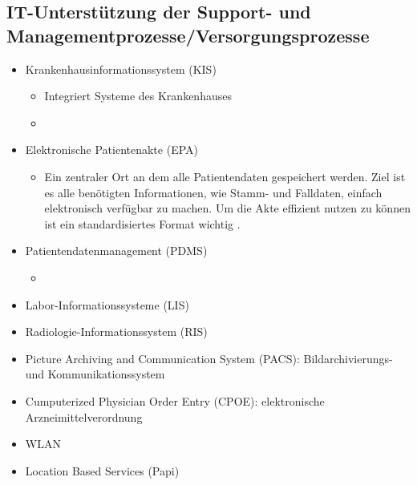 	\subsection{IT-Unterstützung der Support- und Managementprozesse/Versorgungsprozesse}
	\parencite{oswald2019} \parencite[14]{braeutigam2017}
	\begin{itemize}
		\item Krankenhausinformationssystem (KIS)

		\begin{itemize}
			\item Integriert Systeme des Krankenhauses
			\item 
		\end{itemize}
		\item Elektronische Patientenakte (EPA)
		\begin{itemize}
			\item Ein zentraler Ort an dem alle Patientendaten gespeichert werden. Ziel ist es alle benötigten Informationen, wie Stamm- und Falldaten, einfach elektronisch verfügbar zu machen. Um die Akte effizient nutzen zu können ist ein standardisiertes Format wichtig \parencite[62]{oswald2019}.
		\end{itemize}
		\item Patientendatenmanagement (PDMS)
		\begin{itemize}
			\item 
		\end{itemize}
		\item Labor-Informationssysteme (LIS)
		\item Radiologie-Informationssystem (RIS)
		\item Picture Archiving and Communication System (PACS): Bildarchivierungs- und Kommunikationssystem
		\item Cumputerized Physician Order Entry (CPOE): elektronische Arzneimittelverordnung
		\item WLAN
		\item Location Based Services (Papi)
	\end{itemize}
